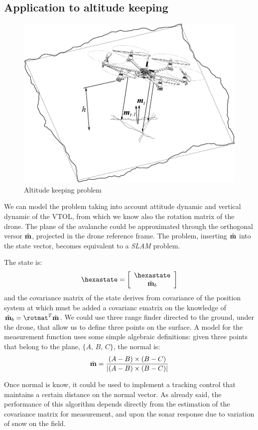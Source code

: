 \subsection{Application to altitude keeping}
\begin{figure}[h]
	\centering
	\includegraphics[scale=0.65]{ch3/img/altitude_keep.pdf}
	\caption{Altitude keeping problem}
	\forceversofloat
\end{figure}
\FloatBarrier
We can model the problem taking into account attitude dynamic and vertical dynamic of the VTOL, from which we know also the rotation matrix of the drone. The plane of the avalanche could be approximated through the orthogonal versor $\hat{\mathbf{m}}$, projected in the drone reference frame. The problem, inserting $\hat{\mathbf{m}}$ into the state vector, becomes equivalent to a \emph{SLAM} problem.

The state is:
\renewcommand{\arraystretch}{1}
\begin{equation}
\hexastate = \vettore{\hexastate \\ \vers{m}_b}
\end{equation}
\renewcommand{\arraystretch}{1.75}
and the covariance matrix of the state derives from covariance of the position system at which must be added a covarianc ematrix on the knowledge of ${\vers{m}_b = \rotmat^{T} \vers{m}}$. We could use three range finder directed to the ground, under the drone, that allow us to define three points on the surface. A model for the measurement function uses some simple algebraic definitions: given three points that belong to the plane, $\{A,\, B,\, C\}$, the normal is:
\begin{equation}
\hat{\mathbf{m}} = \dfrac{(A-B)\times(B-C)}{\left| (A-B)\times(B-C) \right|}
\end{equation}

Once normal is know, it could be used to implement a tracking control that maintains a certain distance on the normal vector. As already said, the performance of this algorithm depends directly from the estimation of the covariance matrix for measurement, and upon the sonar response due to variation of snow on the field.
